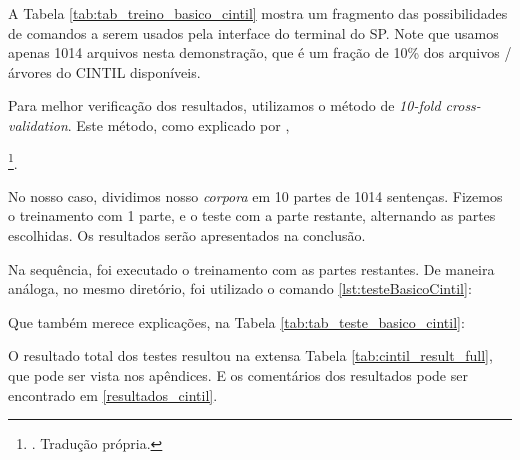 \begin{center}

\end{center}

A Tabela \ref{tab:tab_treino_basico_cintil} mostra um fragmento das possibilidades de comandos a serem usados pela interface do terminal do SP. Note que usamos apenas 1014 arquivos nesta demonstração, que é um fração de 10\% dos arquivos / árvores do CINTIL disponíveis.

Para melhor verificação dos resultados, utilizamos o método de \textit{10-fold cross-validation}. Este método, como explicado por ,
\begin{displayquote}
    \footnote{. Tradução própria.}.
\end{displayquote}

No nosso caso, dividimos nosso \textit{corpora} em 10 partes de 1014 sentenças. Fizemos o treinamento com 1 parte, e o teste com a parte restante, alternando as partes escolhidas.  Os resultados serão apresentados na conclusão.

Na sequência, foi executado o treinamento com as partes restantes. De maneira análoga, no mesmo diretório, foi utilizado o comando \ref{lst:testeBasicoCintil}:

\begin{center}

\end{center}
Que também merece explicações, na Tabela \ref{tab:tab_teste_basico_cintil}:
\begin{center}

\end{center}
O resultado total dos testes resultou na extensa Tabela \ref{tab:cintil_result_full}, que pode ser vista nos apêndices. E os comentários dos resultados pode ser encontrado em \ref{resultados_cintil}.